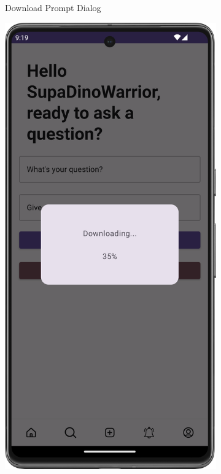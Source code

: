 \begin{figure}[H]
\begin{subfigure}[b]{0.3\textwidth}
    \caption{Download Prompt Dialog}
    \label{fig:download_prompt}
  \end{subfigure}
  \hfill
  \begin{subfigure}[b]{0.3\textwidth}
    \includegraphics[width=\textwidth]{Figures/Product_Images/OCR/download_progress.png}

\end{subfigure}
\end{figure}
